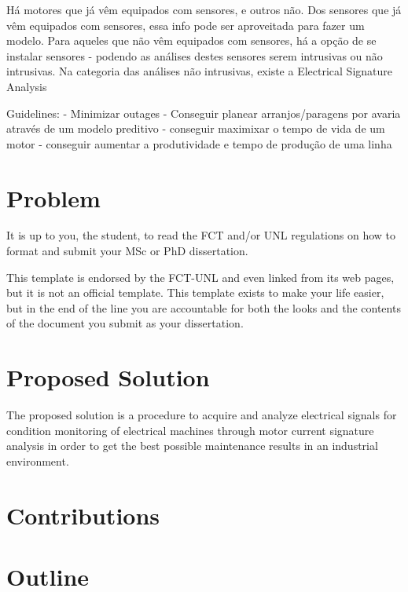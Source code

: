 Há motores que já vêm equipados com sensores, e outros não.
Dos sensores que já vêm equipados com sensores, essa info pode ser aproveitada para fazer um modelo.
Para aqueles que não vêm equipados com sensores, há a opção de se instalar sensores - podendo as análises destes sensores serem intrusivas ou não intrusivas.
Na categoria das análises não intrusivas, existe a Electrical Signature Analysis


Guidelines:
- Minimizar outages
- Conseguir planear arranjos/paragens por avaria através de um modelo preditivo
- conseguir maximixar o tempo de vida de um motor
- conseguir aumentar a produtividade e tempo de produção de uma linha



\section{Problem} %
\label{sec:problem}

It is up to you, the student, to read the FCT and/or UNL regulations on how to format and submit your MSc or PhD dissertation.  

This template is endorsed by the FCT-UNL and even linked from its web pages, but it is not an official template.
%
This template exists to make your life easier, but in the end of the line you are accountable for both the looks and the contents of the document you submit as your dissertation.

\section{Proposed Solution} %
\label{sec:proposed_solution}


The proposed solution is a procedure to acquire and analyze electrical signals for condition monitoring of electrical machines through motor current signature analysis in order to get the best possible maintenance results in an industrial environment.





\section{Contributions} %
\label{sec:contributions}

\section{Outline} %
\label{sec:outline}

